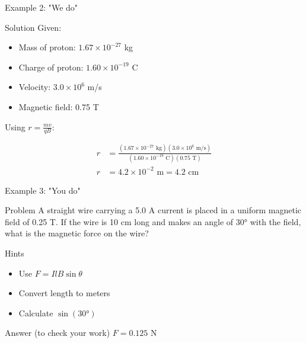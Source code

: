\documentclass{beamer}
\begin{document}
\begin{frame}{Example 2: "We do"}
\pause
\begin{block}{Solution}
Given:
\begin{itemize}
\item Mass of proton: $1.67 \times 10^{-27}$ kg
\item Charge of proton: $1.60 \times 10^{-19}$ C
\item Velocity: $3.0 \times 10^6$ m/s
\item Magnetic field: 0.75 T
\end{itemize}

Using $r = \frac{mv}{qB}$:

\pause

\begin{align}
r &= \frac{(1.67 \times 10^{-27} \text{ kg})(3.0 \times 10^6 \text{ m/s})}{(1.60 \times 10^{-19} \text{ C})(0.75 \text{ T})} \\
r &= 4.2 \times 10^{-2} \text{ m} = 4.2 \text{ cm}
\end{align}
\end{block}
\end{frame}

\begin{frame}{Example 3: "You do"}
\begin{block}{Problem}
A straight wire carrying a 5.0 A current is placed in a uniform magnetic field of 0.25 T. If the wire is 10 cm long and makes an angle of 30° with the field, what is the magnetic force on the wire?
\end{block}
\pause
\begin{block}{Hints}
\begin{itemize}
\item Use $F = IlB\sin\theta$
\item Convert length to meters
\item Calculate $\sin(30°)$
\end{itemize}
\end{block}
\pause
\begin{block}{Answer (to check your work)}
$F = 0.125$ N
\end{block}
\end{frame}
\end{document}
